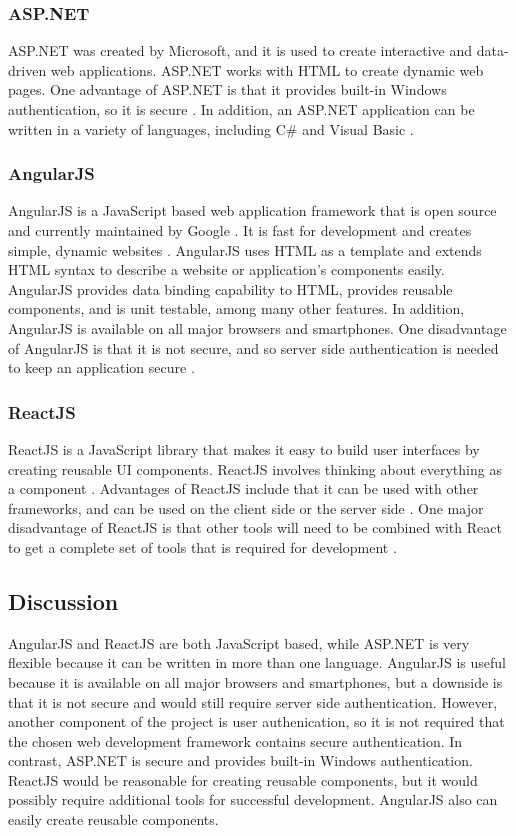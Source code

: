 \documentclass[onecolumn, draftclsnofoot,10pt, compsoc]{IEEEtran}
\begin{document}
\subsubsection{ASP.NET} 
ASP.NET was created by Microsoft, and it is used to create interactive and data-driven web applications\cite{asp.net}. ASP.NET works with HTML to create dynamic web pages. One advantage of ASP.NET is that it provides built-in Windows authentication, so it is secure \cite{asp}. In addition, an ASP.NET application can be written in a variety of languages, including C\# and Visual Basic \cite{asp.net}. 

\subsubsection{AngularJS}
AngularJS is a JavaScript based web application framework that is open source and currently maintained by Google \cite{angular}. It is fast for development and creates simple, dynamic websites \cite{angularjs}. AngularJS uses HTML as a template and extends HTML syntax to describe a website or application's components easily. AngularJS provides data binding capability to HTML, provides reusable components, and is unit testable, among many other features. In addition, AngularJS is available on all major browsers and smartphones. One disadvantage of AngularJS is that it is not secure, and so server side authentication is needed to keep an application secure \cite{angular}.

\subsubsection{ReactJS}
ReactJS is a JavaScript library that makes it easy to build user interfaces by creating reusable UI components\cite{react}. ReactJS involves thinking about everything as a component \cite{react}. Advantages of ReactJS include that it can be used with other frameworks, and can be used on the client side or the server side \cite{react}. One major disadvantage of ReactJS is that other tools will need to be combined with React to get a complete set of tools that is required for development \cite{react}. 

\subsection{Discussion}
AngularJS and ReactJS are both JavaScript based, while ASP.NET is very flexible because it can be written in more than one language. AngularJS is useful because it is available on all major browsers and smartphones, but a downside is that it is not secure and would still require server side authentication. However, another component of the project is user authenication, so it is not required that the chosen web development framework contains secure authentication. In contrast, ASP.NET is secure and provides built-in Windows authentication. ReactJS would be reasonable for creating reusable components, but it would possibly require additional tools for successful development. AngularJS also can easily create reusable components.
\end{document}
